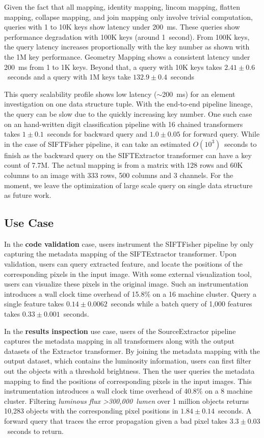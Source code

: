 \documentclass{sig-alternate}
\begin{document}
Given the fact that all mapping, identity mapping, lincom mapping, flatten mapping, collapse mapping, and join mapping
only involve trivial computation, queries with 1 to 10K keys show latency under 200~ms. 
These queries show performance degradation with 100K keys (around 1~second). 
From 100K keys, the query latency increases proportionally with the key number as shown with the 1M key performance.
Geometry Mapping shows a consistent latency under 200~ms from 1 to 1K keys. 
Beyond that, a query with 10K keys takes $2.41\pm0.6$~seconds and a query with 1M keys take $132.9\pm0.4$~seconds

This query scalability profile shows low latency ($\sim$200~ms) for an element investigation on one data structure tuple. 
With the end-to-end pipeline lineage, the query can be slow due to the quickly increasing key number.
One such case on an hand-written digit classification pipeline with 16 chained transformers 
takes $1\pm0.1$~seconds for backward query and $1.0\pm0.05$ for forward query.
While in the case of SIFTFisher pipeline,  it can take an estimated $O(10^3)$~seconds to finish as the backward query on the SIFTExtractor
transformer can have a key count of 7.7M.
The actual mapping is from a matrix with 128 rows and 60K columns to an image with 333 rows, 500 columns and 3 channels. 
For the moment, we leave the optimization of large scale query on single data structure as future work.

\subsection{Use Case}
In the {\bf code validation} case, users instrument the SIFTFisher pipeline by only capturing the metadata mapping of the SIFTExtractor transformer.
Upon validation, users can query extracted feature, and locate the positions of the corresponding pixels in the input image. 
With some external visualization tool, users can visualize these pixels in the original image. 
Such an instrumentation introduces a wall clock time overhead of 15.8\% on a 16 machine cluster.
Query a single feature takes $0.14\pm0.0062$~seconds while a batch query of 1,000 features takes $0.33\pm0.001$~seconds.

In the {\bf results inspection} use case, users of the SourceExtractor pipeline captures the metadata mapping in all transformers along with the output 
datasets of the Extractor transformer. By joining the metadata mapping with the output dataset, which contains the luminosity information, users can first filter out the
objects with a threshold brightness. Then the user queries the metadata mapping to find the positions of corresponding pixels in the input images.
This instrumentation introduces a wall clock time overhead of 40.8\% on a 8 machine cluster. 
Filtering {\it luminous flux >300,000~lumen} over 1 million objects returns 10,283 objects
with the corresponding pixel positions in $1.84\pm0.14$~seconds. 
A forward query that traces the error propagation given a bad pixel takes $3.3\pm0.03$~seconds to return.
\end{document}

